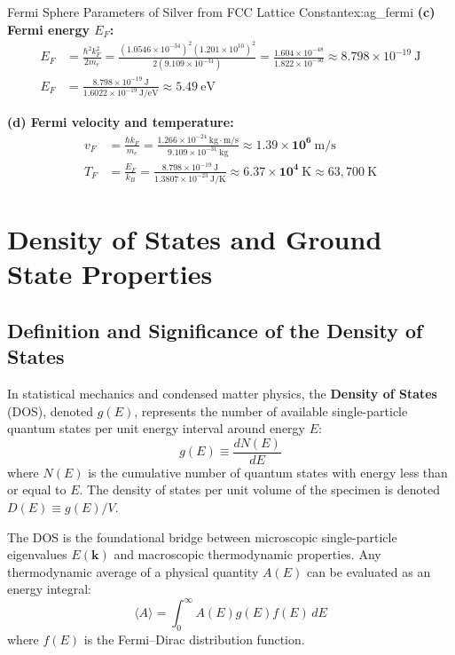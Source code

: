 \documentclass[11pt,a4paper]{article}
\newcommand{\vb}[1]{\mathbf{#1}}
\begin{document}
\begin{examplebox}{Fermi Sphere Parameters of Silver from FCC Lattice Constant}{ex:ag_fermi}
\textbf{(c) Fermi energy $E_F$:}
\begin{align*}
E_F &= \frac{\hbar^2 k_F^2}{2m_e} = \frac{(1.0546 \times 10^{-34})^2 (1.201 \times 10^{10})^2}{2(9.109 \times 10^{-31})} = \frac{1.604 \times 10^{-48}}{1.822 \times 10^{-30}} \approx 8.798 \times 10^{-19}\ \mathrm{J} \\
E_F &= \frac{8.798 \times 10^{-19}\ \mathrm{J}}{1.6022 \times 10^{-19}\ \mathrm{J/eV}} \approx \mathbf{5.49\ \mathrm{eV}}
\end{align*}

\textbf{(d) Fermi velocity and temperature:}
\begin{align*}
v_F &= \frac{\hbar k_F}{m_e} = \frac{1.266 \times 10^{-24}\ \mathrm{kg\cdot m/s}}{9.109 \times 10^{-31}\ \mathrm{kg}} \approx \mathbf{1.39 \times 10^6\ \mathrm{m/s}} \\
T_F &= \frac{E_F}{k_B} = \frac{8.798 \times 10^{-19}\ \mathrm{J}}{1.3807 \times 10^{-23}\ \mathrm{J/K}} \approx \mathbf{6.37 \times 10^4\ \mathrm{K}} \approx 63{,}700\ \mathrm{K}
\end{align*}
\end{examplebox}

\clearpage


\section{Density of States and Ground State Properties}
\label{sec:density_of_states}

\subsection{Definition and Significance of the Density of States}
In statistical mechanics and condensed matter physics, the \textbf{Density of States} (DOS), denoted $g(E)$, represents the number of available single-particle quantum states per unit energy interval around energy $E$:
\begin{equation}
g(E) \equiv \frac{dN(E)}{dE}
\label{eq:dos_definition}
\end{equation}
where $N(E)$ is the cumulative number of quantum states with energy less than or equal to $E$. The density of states per unit volume of the specimen is denoted $D(E) \equiv g(E)/V$. 

The DOS is the foundational bridge between microscopic single-particle eigenvalues $E(\vb{k})$ and macroscopic thermodynamic properties. Any thermodynamic average of a physical quantity $A(E)$ can be evaluated as an energy integral:
\begin{equation}
\langle A \rangle = \int_0^\infty A(E) g(E) f(E)\,dE
\end{equation}
where $f(E)$ is the Fermi--Dirac distribution function.
\end{document}
